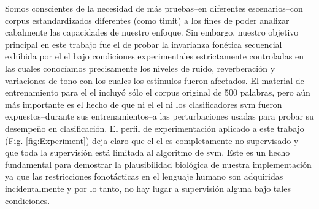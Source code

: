 
Somos conscientes de la necesidad de más pruebas--en diferentes escenarios--con corpus estandardizados diferentes (como \gls{timit}) a los fines de poder analizar cabalmente las capacidades de nuestro enfoque. Sin embargo, nuestro objetivo principal en este trabajo fue el de probar la invarianza fonética secuencial exhibida por el \gls{el} bajo condiciones experimentales estrictamente controladas en las cuales conocíamos precisamente los niveles de ruido, reverberación y variaciones de tono con los cuales los estímulos fueron afectados. El material de entrenamiento para el \gls{el} incluyó sólo el corpus original de 500 palabras, pero aún más importante es el hecho de que ni el \gls{el} ni los clasificadores \gls{svm} fueron expuestos--durante sus entrenamientos--a las perturbaciones usadas para probar su desempeño en clasificación. El perfil de experimentación aplicado a este trabajo (Fig. \ref{fig:Experiment}) deja claro que el \gls{el} es completamente no supervisado y que toda la supervisión está limitada al algoritmo de \gls{svm}. Este es un hecho fundamental para demostrar la plausibilidad biológica de nuestra implementación ya que las restricciones fonotácticas en el lenguaje humano son adquiridas incidentalmente \cite{BRENT199693,saffran_1997} y por lo tanto, no hay lugar a supervisión alguna bajo tales condiciones.

